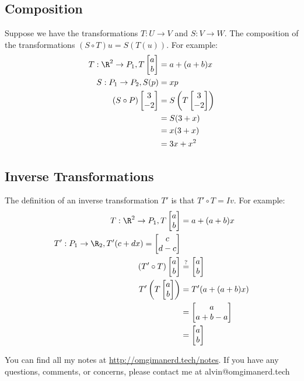 \documentclass{math}
\begin{document}
\subsection*{Composition}
Suppose we have the transformations \( T:U\to V \) and \( S:V\to W \). The
composition of the transformations \( (S\circ T)u = S(T(u)) \). For example:
\begin{align*}
  T:\R^2\to P_1, T\begin{bmatrix}a \\ b\end{bmatrix} &= a+(a+b)x \\
  S:P_1\to P_2, S(p) &= xp \\
  (S\circ P)\begin{bmatrix}3 \\ -2\end{bmatrix} &=
    S\left(T\begin{bmatrix}3 \\ -2\end{bmatrix}\right) \\
  &= S(3+x) \\
  &= x(3+x) \\
  &= 3x+x^2
\end{align*}

\subsection*{Inverse Transformations}
The definition of an inverse transformation \( T' \) is that
\( T'\circ T = Iv \). For example:
\begin{align*}
  T:\R^2\to P_1, T\begin{bmatrix}a \\ b\end{bmatrix} &= a+(a+b)x \\
  T':P_1\to\R_2, T'(c+dx) = \begin{bmatrix}c \\ d-c\end{bmatrix} \\
  (T'\circ T)\begin{bmatrix}a \\ b\end{bmatrix} &\stackrel{?}{=}
    \begin{bmatrix}a \\ b\end{bmatrix} \\
  T'\left(T\begin{bmatrix}a \\ b\end{bmatrix}\right) &=
    T'(a+(a+b)x) \\
  &= \begin{bmatrix}a \\ a+b-a\end{bmatrix} \\
  &= \begin{bmatrix}a \\ b\end{bmatrix}
\end{align*}

\begin{center}
  You can find all my notes at \url{http://omgimanerd.tech/notes}. If you have
  any questions, comments, or concerns, please contact me at
  alvin@omgimanerd.tech
\end{center}
\end{document}
